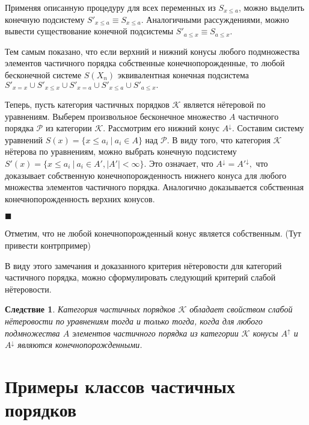 \documentclass[12pt]{article}
\theoremstyle{break}
\newtheorem{Con}{Следствие}
\newenvironment{Proof} %
	{\par\noindent{\bf Доказательство.}} %
	{\hfill$\scriptstyle\blacksquare$} %
\def\P{\mathcal{P}}
\begin{document}
\begin{Proof}
			Применяя описанную процедуру для всех переменных из $S_{x\leqslant a}$, можно выделить конечную подсистему $S'_{x\leqslant a}\equiv S_{x\leqslant a}.$ Аналогичными рассуждениями, можно вывести существование конечной подсистемы $S'_{a\leqslant x}\equiv S_{a\leqslant x}.$

			Тем самым показано, что если верхний и нижний конусы любого подмножества элементов частичного порядка собственные конечнопорожденные, то любой бесконечной системе $S(X_n)$ эквивалентная конечная подсистема $S'_{x=x}\cup S'_{x\leqslant x}\cup S'_{x=a}\cup S'_{x\leqslant a}\cup S'_{a\leqslant x}.$  

			Теперь, пусть категория частичных порядков $\mathcal{K}$ является нётеровой по уравнениям. Выберем произвольное бесконечное множество $A$ частичного порядка $\P$ из категории $\mathcal{K}.$ Рассмотрим его нижний конус $A^{\downarrow}$. Составим систему уравнений $S(x) = \{x\leqslant a_i\ |\ a_i\in A\}$ над $\P$. В виду того, что категория $\mathcal{K}$ нётерова по уравнениям, можно выбрать конечную подсистему $S'(x)=\{x\leqslant a_i\ |\ a_i\in A', |A'|<\infty\}.$ Это означает, что $A^{\downarrow} = A'^{\downarrow},$ что доказывает собственную конечнопорожденность нижнего конуса для любого множества элементов частичного порядка. Аналогично доказывается собственная конечнопорожденность верхних конусов.

		\end{Proof}

		Отметим, что не любой конечнопорожденный конус является собственным. (Тут привести контрпример)

		В виду этого замечания и доказанного критерия нётеровости для категорий частичного порядка, можно сформулировать следующий критерий слабой нётеровости.

		\begin{Con}
			Категория частичных порядков $\mathcal{K}$ обладает свойством слабой нётеровости по уравнениям тогда и только тогда, когда для любого подмножества $A$ элементов частичного порядка из категории $\mathcal{K}$ конусы $A^{\uparrow}$ и $A^{\downarrow}$ являются конечнопорожденными.
		\end{Con}


	\section{Примеры классов частичных порядков}
		
	
\end{document}
